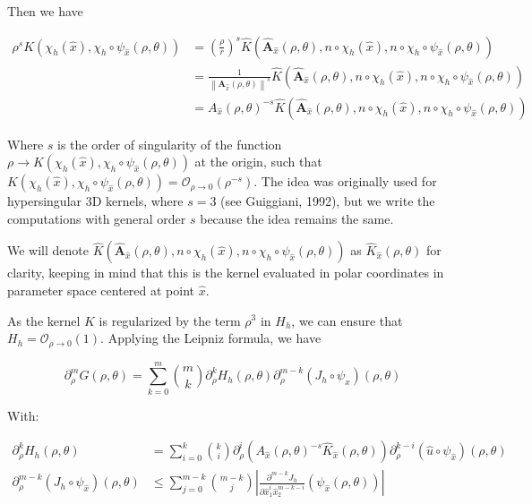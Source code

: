 ﻿\documentclass{article}
\begin{document}
Then we have 

\begin{align}\label{eq:reg-pol-kernel}
  \rho^s K(\chi_h(\hat x), \chi_h\circ\psi_{\hat x}(\rho, \theta))
  & = \left(\frac{\rho}{r}\right)^s
  \hat K\!\left(\hat{\mathbf A}_{\hat x}(\rho, \theta),
  n\circ\chi_h(\hat x),
  n\circ\chi_h\circ\psi_{\hat x}(\rho,\theta)\right) \\
  & = \frac{1}{\left\|\bm A_{\hat x}(\rho, \theta)\right\|^s}
  \hat K\!\left(\hat{\mathbf A}_{\hat x}(\rho, \theta),
  n\circ\chi_h(\hat x),
  n\circ\chi_h\circ\psi_{\hat x}(\rho,\theta)\right) \\
  & = A_{\hat x}(\rho, \theta)^{-s}
  \hat K\!\left(\hat{\mathbf A}_{\hat x}(\rho, \theta),
  n\circ\chi_h(\hat x),
  n\circ\chi_h\circ\psi_{\hat x}(\rho,\theta)\right)
\end{align}

Where $s$ is the order of singularity of the function $\rho\to K(\chi_h(\hat x), \chi_h\circ\psi_{\hat x}(\rho, \theta))$ at the origin, such that $K(\chi_h(\hat x), \chi_h\circ\psi_{\hat x}(\rho, \theta)) = \mathcal O_{\rho\to 0}(\rho^{-s})$. The idea was originally used for hypersingular 3D kernels, where $s = 3$ (see Guiggiani, 1992), but we write the computations with general order $s$ because the idea remains the same.

We will denote $\hat K\!\left(\hat{\mathbf A}_{\hat x}(\rho, \theta),
  n\circ\chi_h(\hat x),
  n\circ\chi_h\circ\psi_{\hat x}(\rho,\theta)\right)$ as $\hat K_{\hat x}(\rho, \theta)$ for clarity, keeping in mind that this is the kernel evaluated in polar coordinates in parameter space centered at point $\hat x$.

As the kernel $K$ is regularized by the term $\rho^3$ in $H_h$, we can ensure that $H_h = \mathcal O_{\rho\to 0} (1)$. Applying the Leipniz formula, we have

\begin{equation}
  \partial^m_{\rho}G(\rho, \theta) = \sum_{k=0}^{m}\binom{m}{k} \partial^k_{\rho} H_h(\rho, \theta) \partial^{m-k}_{\rho}(J_h\circ\psi_{\hat x})(\rho, \theta)
\end{equation}

With:

\begin{align*}
  \partial_{\rho}^{k}H_h(\rho, \theta) & = \sum_{i=0}^{k}\binom{k}{i}\partial^{i}_{\rho}\left(A_{\hat x}(\rho, \theta)^{-s}\hat K_{\hat x}(\rho, \theta)\right)\partial^{k-i}_\rho(\hat u\circ\psi_{\hat x})(\rho, \theta) \\
  \partial_{\rho}^{m-k}(J_h\circ\psi_{\hat x})(\rho, \theta) & \leq \sum_{j=0}^{m-k}\binom{m-k}{j}\left|\frac{\partial^{m-k}J_h}{\partial\hat x_1^{i}\hat x_2^{m-k-i}}(\psi_{\hat x}(\rho, \theta))\right|
\end{align*}
\end{document}
